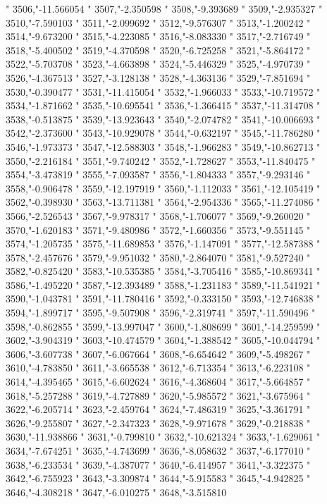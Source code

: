"
3506,"-11.566054
"
3507,"-2.350598
"
3508,"-9.393689
"
3509,"-2.935327
"
3510,"-7.590103
"
3511,"-2.099692
"
3512,"-9.576307
"
3513,"-1.200242
"
3514,"-9.673200
"
3515,"-4.223085
"
3516,"-8.083330
"
3517,"-2.716749
"
3518,"-5.400502
"
3519,"-4.370598
"
3520,"-6.725258
"
3521,"-5.864172
"
3522,"-5.703708
"
3523,"-4.663898
"
3524,"-5.446329
"
3525,"-4.970739
"
3526,"-4.367513
"
3527,"-3.128138
"
3528,"-4.363136
"
3529,"-7.851694
"
3530,"-0.390477
"
3531,"-11.415054
"
3532,"-1.966033
"
3533,"-10.719572
"
3534,"-1.871662
"
3535,"-10.695541
"
3536,"-1.366415
"
3537,"-11.314708
"
3538,"-0.513875
"
3539,"-13.923643
"
3540,"-2.074782
"
3541,"-10.006693
"
3542,"-2.373600
"
3543,"-10.929078
"
3544,"-0.632197
"
3545,"-11.786280
"
3546,"-1.973373
"
3547,"-12.588303
"
3548,"-1.966283
"
3549,"-10.862713
"
3550,"-2.216184
"
3551,"-9.740242
"
3552,"-1.728627
"
3553,"-11.840475
"
3554,"-3.473819
"
3555,"-7.093587
"
3556,"-1.804333
"
3557,"-9.293146
"
3558,"-0.906478
"
3559,"-12.197919
"
3560,"-1.112033
"
3561,"-12.105419
"
3562,"-0.398930
"
3563,"-13.711381
"
3564,"-2.954336
"
3565,"-11.274086
"
3566,"-2.526543
"
3567,"-9.978317
"
3568,"-1.706077
"
3569,"-9.260020
"
3570,"-1.620183
"
3571,"-9.480986
"
3572,"-1.660356
"
3573,"-9.551145
"
3574,"-1.205735
"
3575,"-11.689853
"
3576,"-1.147091
"
3577,"-12.587388
"
3578,"-2.457676
"
3579,"-9.951032
"
3580,"-2.864070
"
3581,"-9.527240
"
3582,"-0.825420
"
3583,"-10.535385
"
3584,"-3.705416
"
3585,"-10.869341
"
3586,"-1.495220
"
3587,"-12.393489
"
3588,"-1.231183
"
3589,"-11.541921
"
3590,"-1.043781
"
3591,"-11.780416
"
3592,"-0.333150
"
3593,"-12.746838
"
3594,"-1.899717
"
3595,"-9.507908
"
3596,"-2.319741
"
3597,"-11.590496
"
3598,"-0.862855
"
3599,"-13.997047
"
3600,"-1.808699
"
3601,"-14.259599
"
3602,"-3.904319
"
3603,"-10.474579
"
3604,"-1.388542
"
3605,"-10.044794
"
3606,"-3.607738
"
3607,"-6.067664
"
3608,"-6.654642
"
3609,"-5.498267
"
3610,"-4.783850
"
3611,"-3.665538
"
3612,"-6.713354
"
3613,"-6.223108
"
3614,"-4.395465
"
3615,"-6.602624
"
3616,"-4.368604
"
3617,"-5.664857
"
3618,"-5.257288
"
3619,"-4.727889
"
3620,"-5.985572
"
3621,"-3.675964
"
3622,"-6.205714
"
3623,"-2.459764
"
3624,"-7.486319
"
3625,"-3.361791
"
3626,"-9.255807
"
3627,"-2.347323
"
3628,"-9.971678
"
3629,"-0.218838
"
3630,"-11.938866
"
3631,"-0.799810
"
3632,"-10.621324
"
3633,"-1.629061
"
3634,"-7.674251
"
3635,"-4.743699
"
3636,"-8.058632
"
3637,"-6.177010
"
3638,"-6.233534
"
3639,"-4.387077
"
3640,"-6.414957
"
3641,"-3.322375
"
3642,"-6.755923
"
3643,"-3.309874
"
3644,"-5.915583
"
3645,"-4.942825
"
3646,"-4.308218
"
3647,"-6.010275
"
3648,"-3.515810
